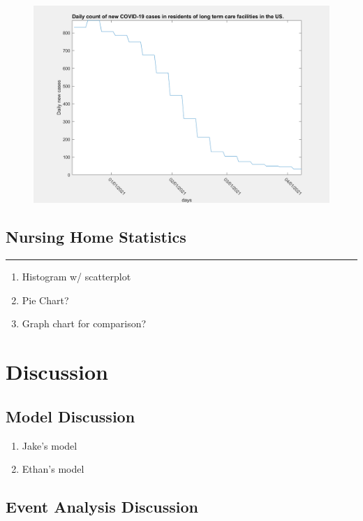 \documentclass[twoside]{article}
\begin{document}
\begin{multicols}{2}
\begin{figure}[H]
	\includegraphics[width=\linewidth]{images/usa_daily_ltc_cases_unprocessed.png}
	\caption{}
	\label{fig:images/usa_daily_ltc_cases_unprocessedLabel}
\end{figure}

\subsection{Nursing Home Statistics}
\rule{\linewidth}{0.25pt}

\begin{enumerate}
	\item Histogram w/ scatterplot 
	\item Pie Chart?
	\item Graph chart for comparison?
\end{enumerate}


\section{Discussion}

\subsection{Model Discussion}

\begin{enumerate}
	\item Jake's model
	\item Ethan's model
\end{enumerate}


\subsection{Event Analysis Discussion}


\end{multicols}
\end{document}
